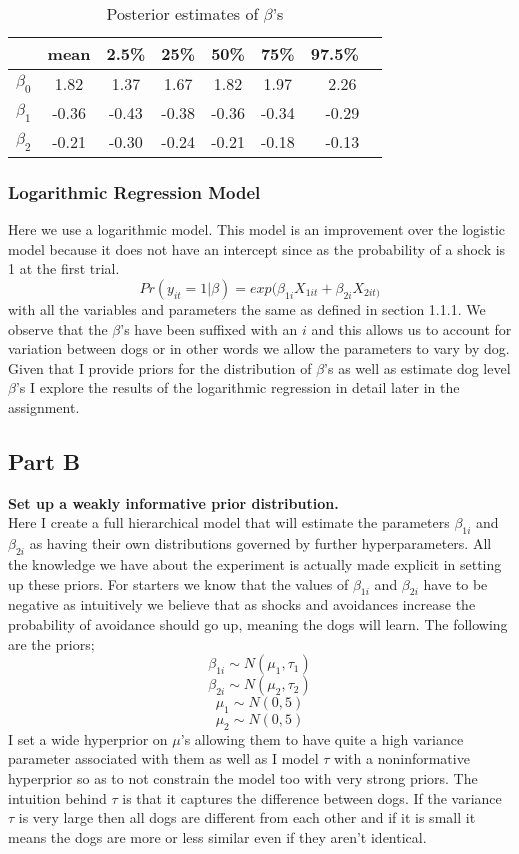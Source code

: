 \documentclass{article}
\begin{document}
\begin{table}[H]
\caption {Posterior estimates of $\beta$'s}
\vspace{2mm}
\centering \begin{tabular}{c c c c c c c} 
\hline\hline 
\vspace{1mm}
& mean & 2.5\% &  25\% &  50\% &  75\% & 97.5\% \ \\ [0.5ex] 
\hline 
$\beta_0$ & 1.82 & 1.37 & 1.67 & 1.82 & 1.97 & 2.26 \\ 
$\beta_1$ & -0.36 & -0.43 & -0.38 & -0.36 & -0.34 & -0.29 \\
$\beta_2$ & -0.21 & -0.30 & -0.24 & -0.21 & -0.18 & -0.13 \\[1ex] \hline 
\end{tabular}
\end{table}

\subsubsection{Logarithmic Regression Model}
Here we use a logarithmic model. This model is an improvement over the logistic model because it does not have an intercept since as the probability of a shock is 1 at the first trial. 
$$Pr(y_{it} = 1|\beta) = exp(\beta_{1i} X_{1it} + \beta_{2i} X_{2it)}$$
with all the variables and parameters the same as defined in section 1.1.1. We observe that the $\beta$'s have been suffixed with an $i$ and this allows us to account for variation between dogs or in other words we allow the parameters to vary by dog. Given that I provide priors for the distribution of $\beta$'s as well as estimate dog level $\beta$'s I explore the results of the logarithmic regression in detail later in the assignment.

\subsection{Part B}
\textbf{Set up a weakly informative prior distribution.}\\
Here I create a full hierarchical model that will estimate the parameters $\beta_{1i}$ and $\beta_{2i}$ as having their own distributions governed by further hyperparameters. All the knowledge we have about the experiment is actually made explicit in setting up these priors. For starters we know that the values of $\beta_{1i}$ and $\beta_{2i}$ have to be negative as intuitively we believe that as shocks and avoidances increase the probability of avoidance should go up, meaning the dogs will learn. The following are the priors;
$$\beta_{1i} \sim N(\mu_1, \tau_1)$$
$$\beta_{2i} \sim N(\mu_2, \tau_2)$$
$$\mu_1 \sim N(0,5)$$
$$\mu_2 \sim N(0,5)$$
I set a wide hyperprior on $\mu$'s allowing them to have quite a high variance parameter associated with them as well as I model $\tau$ with a noninformative hyperprior so as to not constrain the model too with very strong priors. The intuition behind $\tau$ is that it captures the difference between dogs. If the variance $\tau$ is very large then all dogs are different from each other and if it is small it means the dogs are more or less similar even if they aren't identical.
\end{document}
